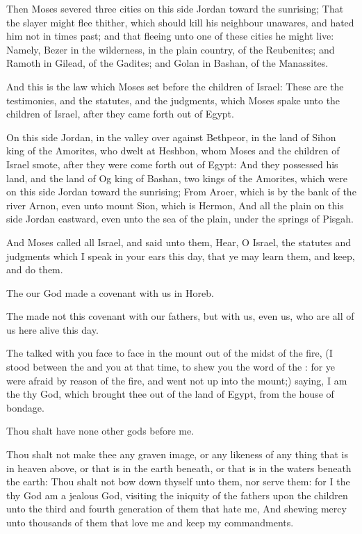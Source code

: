 \Verse Then Moses severed three cities on this side Jordan toward the sunrising; \Verse That the slayer might flee thither, which should kill his neighbour unawares, and hated him not in times past; and that fleeing unto one of these cities he might live: \Verse Namely, Bezer in the wilderness, in the plain country, of the Reubenites; and Ramoth in Gilead, of the Gadites; and Golan in Bashan, of the Manassites.

\Verse And this is the law which Moses set before the children of Israel: \Verse These are the testimonies, and the statutes, and the judgments, which Moses spake unto the children of Israel, after they came forth out of Egypt.

\Verse On this side Jordan, in the valley over against Bethpeor, in the land of Sihon king of the Amorites, who dwelt at Heshbon, whom Moses and the children of Israel smote, after they were come forth out of Egypt: \Verse And they possessed his land, and the land of Og king of Bashan, two kings of the Amorites, which were on this side Jordan toward the sunrising; \Verse From Aroer, which is by the bank of the river Arnon, even unto mount Sion, which is Hermon, \Verse And all the plain on this side Jordan eastward, even unto the sea of the plain, under the springs of Pisgah.


\Chapter
\Verse And Moses called all Israel, and said unto them, Hear, O Israel, the statutes and judgments which I speak in your ears this day, that ye may learn them, and keep, and do them.

\Verse The \LORD our God made a covenant with us in Horeb.

\Verse The \LORD made not this covenant with our fathers, but with us, even us, who are all of us here alive this day.

\Verse The \LORD talked with you face to face in the mount out of the midst of the fire, \Verse (I stood between the \LORD and you at that time, to shew you the word of the \LORD: for ye were afraid by reason of the fire, and went not up into the mount;) saying, \Verse I am the \LORD thy God, which brought thee out of the land of Egypt, from the house of bondage.

\Verse Thou shalt have none other gods before me.

\Verse Thou shalt not make thee any graven image, or any likeness of any thing that is in heaven above, or that is in the earth beneath, or that is in the waters beneath the earth: \Verse Thou shalt not bow down thyself unto them, nor serve them: for I the \LORD thy God am a jealous God, visiting the iniquity of the fathers upon the children unto the third and fourth generation of them that hate me, \Verse And shewing mercy unto thousands of them that love me and keep my commandments.

